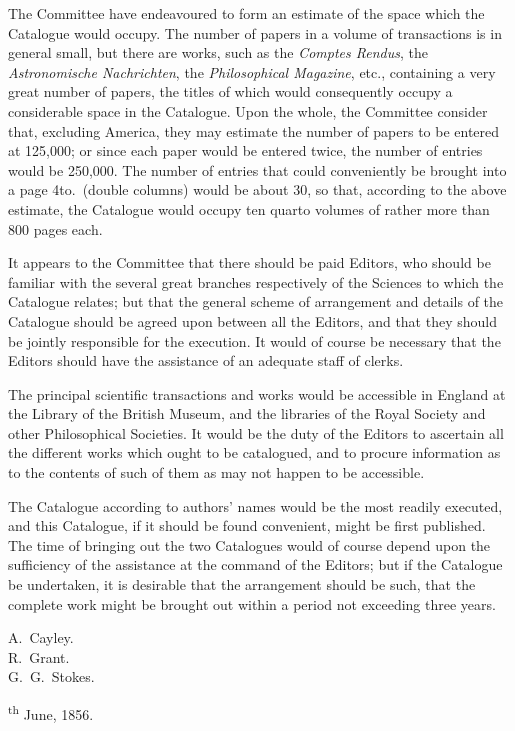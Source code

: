 \documentclass[11pt]{article}
\begin{document}
The Committee have endeavoured to form an estimate of the space which the Catalogue would occupy. The number of papers in a volume of transactions is in general small, but there are works, such as the \emph{Comptes Rendus}, the \emph{Astronomische Nachrichten}, the \emph{Philosophical Magazine}, etc., containing a very great number of papers, the titles of which would consequently occupy a considerable space in the Catalogue. Upon the whole, the Committee consider that, excluding America, they may estimate the number of papers to be entered at 125,000; or since each paper would be entered twice, the number of entries would be 250,000. The number of entries that could conveniently be brought into a page 4to.~(double columns) would be about 30, so that, according to the above estimate, the Catalogue would occupy ten quarto volumes of rather more than 800 pages each.

It appears to the Committee that there should be paid Editors, who should be familiar with the several great branches respectively of the Sciences to which the Catalogue relates; but that the general scheme of arrangement and details of the Catalogue should be agreed upon between all the Editors, and that they should be jointly responsible for the execution. It would of course be necessary that the Editors should have the assistance of an adequate staff of clerks.

The principal scientific transactions and works would be accessible in England at the Library of the British Museum, and the libraries of the Royal Society and other Philosophical Societies. It would be the duty of the Editors to ascertain all the different works which ought to be catalogued, and to procure information as to the contents of such of them as may not happen to be accessible.

The Catalogue according to authors' names would be the most readily executed, and this Catalogue, if it should be found convenient, might be first published. The time of bringing out the two Catalogues would of course depend upon the sufficiency of the assistance at the command of the Editors; but if the Catalogue be undertaken, it is desirable that the arrangement should be such, that the complete work might be brought out within a period not exceeding three years.

\medskip
\begin{flushright}
A.~Cayley.\\
R.~Grant.\\
G.~G.~Stokes.\\
\end{flushright}
\textsuperscript{th} June, 1856.
\end{document}
